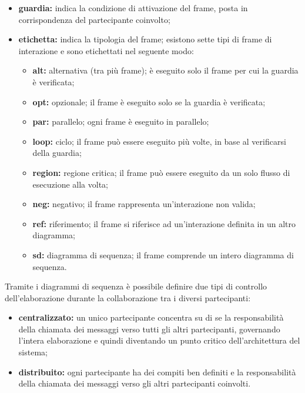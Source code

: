 \begin{itemize}[leftmargin=1.5cm]
							\begin{itemize}
								\item \textbf{guardia:} indica la condizione di attivazione del frame, posta in corrispondenza del partecipante coinvolto;
								\item \textbf{etichetta:} indica la tipologia del frame; esistono sette tipi di frame di interazione e sono etichettati nel seguente modo:
								\begin{itemize}
									\item \textbf{alt:} alternativa (tra più frame); è eseguito solo il frame per cui la guardia è verificata;
									\item \textbf{opt:} opzionale; il frame è eseguito solo se la guardia è verificata;
									\item \textbf{par:} parallelo; ogni frame è eseguito in parallelo;
									\item \textbf{loop:} ciclo; il frame può essere eseguito più volte, in base al verificarsi della guardia;
									\item \textbf{region:} regione critica; il frame può essere eseguito da un solo flusso di esecuzione alla volta;
									\item \textbf{neg:} negativo; il frame rappresenta un'interazione non valida;
									\item \textbf{ref:} riferimento; il frame si riferisce ad un'interazione definita in un altro diagramma;
									\item \textbf{sd:} diagramma di sequenza; il frame comprende un intero diagramma di sequenza.
								\end{itemize}
							\end{itemize}
						\end{itemize}

						\hangindent=0.6cm Tramite i diagrammi di sequenza è possibile definire due tipi di controllo dell'elaborazione durante la collaborazione tra i diversi partecipanti:
						\begin{itemize}[leftmargin=1.5cm]
							\item \textbf{centralizzato:} un unico partecipante concentra su di se la responsabilità della chiamata dei messaggi verso tutti gli altri partecipanti, governando l'intera elaborazione e quindi diventando un punto critico dell'architettura del sistema;
							\item \textbf{distribuito:} ogni partecipante ha dei compiti ben definiti e la responsabilità della chiamata dei messaggi verso gli altri partecipanti coinvolti.
						\end{itemize}
						
